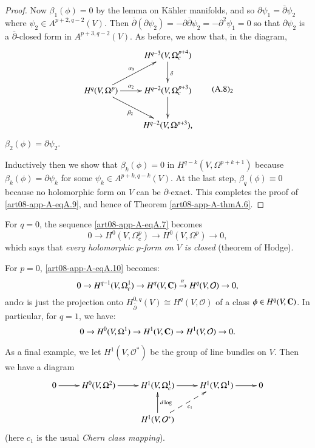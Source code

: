 \begin{proof}
Now $\beta_{1}(\phi)=0$ by the lemma on K\"ahler manifolds, and so $\partial \psi_{1}=\overline{\partial}\psi_{2}$ where $\psi_{2}\in A^{p+2,q-2}(V)$. Then $\overline{\partial}(\partial\psi_{2})=-\partial\overline{\partial}\psi_{2}=-\partial^{2}\psi_{1}=0$ so that $\partial \psi_{2}$ is a $\overline{\partial}$-closed form in $A^{p+3,q-2}(V)$. As before, we show that, in the diagram,
\begin{equation*}
\vcenter{\xymatrix{
 & H^{q-3}(V,\Omega^{p+4}_{c})\ar[d]^{\delta}\\
H^{q}(V,\Omega^{p})\ar[r]^-{\alpha_{2}}\ar[ur]^-{\alpha_{3}}\ar[dr]_-{\beta_{2}} & H^{q-2}(V,\Omega^{p+3}_{c})\ar[d]\\
 & H^{q-2}(V,\Omega^{p+3}),
}}\tag*{(A.8)$_{2}$}\label{art08-app-A-eqA.8-2}
\end{equation*}
$\beta_{2}(\phi)=\partial \psi_{2}$.

Inductively then we show that $\beta_{k}(\phi)=0$ in $H^{q-k}(V,\Omega^{p+k+1})$ because $\beta_{k}(\phi)=\partial \psi_{k}$ for some $\psi_{k}\in A^{p+k,q-k}(V)$. At the last step, $\beta_{q}(\phi)\equiv 0$ because no holomorphic form on $V$ can be $\partial$-exact. This completes the proof of \eqref{art08-app-A-eqA.9}, and hence of Theorem \ref{art08-app-A-thmA.6}.
\end{proof}

\begin{examples*}
For $q=0$, the sequence \eqref{art08-app-A-eqA.7} becomes
\begin{equation}
0\to H^{0}(V,\Omega^{p}_{c})\to H^{0}(V,\Omega^{p})\to 0,\label{art08-app-A-eqA.11}
\end{equation}
which says that {\em every holomorphic $p$-form on $V$ is closed} (theorem of Hodge).

For $p=0$, \eqref{art08-app-A-eqA.10} becomes:
\begin{equation}
0\to H^{q-1}(V,\Omega^{1}_{c})\to H^{q}(V,\mathbf{C})\xrightarrow{\alpha}H^{q}(V,\mathcal{O})\to 0,\label{art08-app-A-eqA.12} 
\end{equation}
and\pageoriginale $\alpha$ is just the projection onto $H^{0,q}_{\overline{\partial}}(V)\cong H^{q}(V,\mathcal{O})$ of a class $\phi\in H^{q}(V,\mathbf{C})$. In particular, for $q=1$, we have:
\begin{equation}
0\to H^{0}(V,\Omega^{1})\to H^{1}(V,\mathbf{C})\to H^{1}(V,\mathcal{O})\to 0.\label{art08-app-A-eqA.13} 
\end{equation}

As a final example, we let $H^{1}(V,\mathcal{O}^{*})$ be the group of line bundles on $V$. Then we have a diagram
\begin{equation}
\vcenter{\xymatrix{
0\ar[r] & H^{0}(V,\Omega^{2})\ar[r] & H^{1}(V,\Omega^{1}_{c})\ar[r] & H^{1}(V,\Omega^{1})\ar[r] & 0\\
        &                          & H^{1}(V,\mathcal{O}^{*})\ar[u]_{d\log}\ar@{-->}[ur]_{c_{1}}
}}\label{art08-app-A-eqA.14} 
\end{equation}
(here $c_{1}$ is the usual {\em Chern class mapping}).
\end{examples*}

